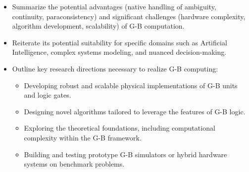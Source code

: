\documentclass{article}
\begin{document}
\begin{itemize}
    \item Summarize the potential advantages (native handling of ambiguity, continuity, paraconsistency) and significant challenges (hardware complexity, algorithm development, scalability) of G-B computation.
    \item Reiterate its potential suitability for specific domains such as Artificial Intelligence, complex systems modeling, and nuanced decision-making.
    \item Outline key research directions necessary to realize G-B computing:
        \begin{itemize}
            \item Developing robust and scalable physical implementations of G-B units and logic gates.
            \item Designing novel algorithms tailored to leverage the features of G-B logic.
            \item Exploring the theoretical foundations, including computational complexity within the G-B framework.
            \item Building and testing prototype G-B simulators or hybrid hardware systems on benchmark problems.
        \end{itemize}
\end{itemize}
\end{document}
